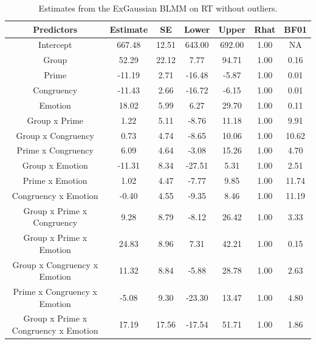 \documentclass[
  11pt,
  english,
  ,doc,floatsintext]{apa6}
\begin{document}
\begin{table}[!h]

\begin{center}
\begin{threeparttable}

\caption{\label{tab:summaryBMwo}Estimates from the ExGaussian BLMM on RT without outliers.}

\small{

\begin{tabular}{ccccccc}
\toprule
Predictors & \multicolumn{1}{c}{Estimate} & \multicolumn{1}{c}{SE} & \multicolumn{1}{c}{Lower} & \multicolumn{1}{c}{Upper} & \multicolumn{1}{c}{Rhat} & \multicolumn{1}{c}{BF01}\\
\midrule
Intercept & 667.48 & 12.51 & 643.00 & 692.00 & 1.00 & NA\\
Group & 52.29 & 22.12 & 7.77 & 94.71 & 1.00 & 0.16\\
Prime & -11.19 & 2.71 & -16.48 & -5.87 & 1.00 & 0.01\\
Congruency & -11.43 & 2.66 & -16.72 & -6.15 & 1.00 & 0.01\\
Emotion & 18.02 & 5.99 & 6.27 & 29.70 & 1.00 & 0.11\\
Group x Prime & 1.22 & 5.11 & -8.76 & 11.18 & 1.00 & 9.91\\
Group x Congruency & 0.73 & 4.74 & -8.65 & 10.06 & 1.00 & 10.62\\
Prime x Congruency & 6.09 & 4.64 & -3.08 & 15.26 & 1.00 & 4.70\\
Group x Emotion & -11.31 & 8.34 & -27.51 & 5.31 & 1.00 & 2.51\\
Prime x Emotion & 1.02 & 4.47 & -7.77 & 9.85 & 1.00 & 11.74\\
Congruency x Emotion & -0.40 & 4.55 & -9.35 & 8.46 & 1.00 & 11.19\\
Group x Prime x Congruency & 9.28 & 8.79 & -8.12 & 26.42 & 1.00 & 3.33\\
Group x Prime x Emotion & 24.83 & 8.96 & 7.31 & 42.21 & 1.00 & 0.15\\
Group x Congruency x Emotion & 11.32 & 8.84 & -5.88 & 28.78 & 1.00 & 2.63\\
Prime x Congruency x Emotion & -5.08 & 9.30 & -23.30 & 13.47 & 1.00 & 4.80\\
Group x Prime x Congruency x Emotion & 17.19 & 17.56 & -17.54 & 51.71 & 1.00 & 1.86\\
\bottomrule
\end{tabular}

}

\end{threeparttable}
\end{center}

\end{table}
\end{document}
